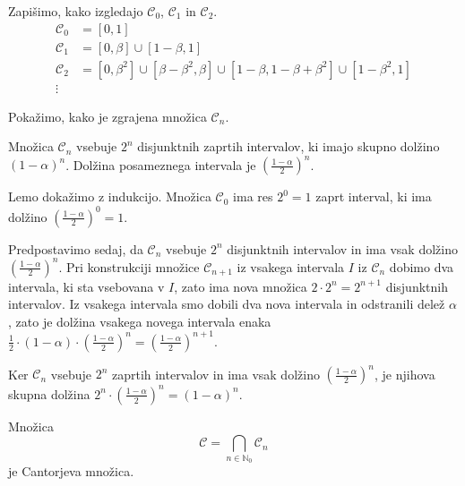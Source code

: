 \documentclass{isrmdelo}
\newcommand{\N}{\mathbb N}
\newcommand{\cantorset}{\mathcal{C}}
\begin{document}
Zapišimo, kako izgledajo $\cantorset_0$, $\cantorset_1$ in $\cantorset_2$.
\begin{align*}
\cantorset_0 &= [0, 1] \\
\cantorset_1 &= [0, \beta] \cup [1 - \beta, 1] \\
\cantorset_2 &= [0, \beta^2] \cup [\beta - \beta^2, \beta] \cup [1 - \beta, 1 - \beta + \beta^2] \cup [1 - \beta^2, 1] \\
\vdots \phantom{.} &
\end{align*}

Pokažimo, kako je zgrajena množica $\cantorset_n$.

\begin{lema}
Množica $\cantorset_n$ vsebuje $2^n$ disjunktnih zaprtih intervalov, ki imajo skupno dolžino $(1-\alpha)^n$. Dolžina posameznega intervala je $(\frac{1-\alpha}{2})^n$.
\end{lema}

\begin{dokaz}
Lemo dokažimo z indukcijo. Množica $\cantorset_0$ ima res $2^0 = 1$ zaprt interval, ki ima dolžino $(\frac{1-\alpha}{2})^0 = 1$. 

Predpostavimo sedaj, da $\cantorset_n$ vsebuje $2^n$ disjunktnih intervalov in ima vsak dolžino $(\frac{1-\alpha}{2})^n$. Pri konstrukciji množice $\cantorset_{n+1}$ iz vsakega intervala $I$ iz $\cantorset_n$ dobimo dva intervala, ki sta vsebovana v $I$, zato ima nova množica $2 \cdot 2^n = 2^{n+1}$ disjunktnih intervalov. Iz vsakega intervala smo dobili dva nova intervala in odstranili delež $\alpha$, zato je dolžina vsakega novega intervala enaka $\frac{1}{2} \cdot (1-\alpha) \cdot (\frac{1-\alpha}{2})^n = (\frac{1-\alpha}{2})^{n+1}$.

Ker $\cantorset_n$ vsebuje $2^n$ zaprtih intervalov in ima vsak dolžino $(\frac{1-\alpha}{2})^n$, je njihova skupna dolžina $2^n \cdot (\frac{1-\alpha}{2})^n = (1-\alpha)^n$. \qedhere
\end{dokaz}

\begin{trditev}
Množica $$\cantorset = \bigcap_{n \in \N_0} \cantorset_n$$ je Cantorjeva množica.
\end{trditev}
\end{document}
